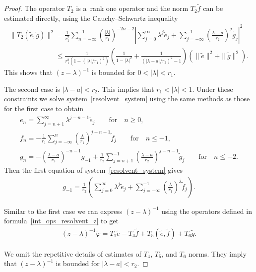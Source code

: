 \documentclass[11pt]{article}
\numberwithin{equation}{section}
\begin{document}
\begin{proof}
The operator $T_2$ is a~rank one operator and the norm $T_2\tilde{f}$ can be estimated directly, using the
Cauchy--Schwartz inequality
\begin{gather*}
\|T_2(\tilde{e},\tilde{g})\|^2=
\frac{1}{r_1^2}\sum\limits_{n=-\infty}^{-1}\left(\frac{|\lambda|}{r_1}\right)^{-2n-2}\left|\sum\limits_{j=0}^\infty\lambda^j\tilde{e}_j
+ \sum\limits_{j=-\infty}^{-1}\left(\frac{\lambda-a}{r_2}\right)^j\tilde{g}_j\right|^2
\\
\phantom{\|T_2(\tilde{e},\tilde{g})\|^2}{}
 \le\frac{1}{r_1^2(1-(|\lambda|/r_1)^2)}\left(\frac{1}{1-|\lambda|^2}+ \frac{1}{(|\lambda-a|/r_2)^2-1}\right)
\left(\|\tilde{e}\|^2+\|\tilde{g}\|^2\right).
\end{gather*}
This shows that $(z-\lambda)^{-1}$ is bounded for $0<|\lambda|<r_1$.

The second case is $|\lambda-a|<r_2$.
This implies that $r_1<|\lambda|<1$.
Under these constraints we solve system~\eqref{resolvent_system} using the same methods as those for the f\/irst case to
obtain
\begin{gather*}
e_n =\sum\limits_{j=n+1}^\infty \lambda^{j-n-1}\tilde{e}_j
\qquad\text{for}\quad n\ge0,
\\
f_n =-\frac{1}{r_1}\sum\limits_{j=-\infty}^n \left(\frac{\lambda}{r_1}\right)^{j-n-1}\tilde{f}_j
\qquad\text{for}\quad n\le-1,
\\
g_n =-\left(\frac{\lambda-a}{r_2}\right)^{-n-1}g_{-1}+\frac{1}{r_2}\sum\limits_{j=n+1}^{-1}\left(\frac{\lambda-a}{r_2}\right)^{j-n-1}\tilde{g}_j
\qquad
\text{for}
\quad
n\le-2.
\end{gather*}
Then the f\/irst equation of system~\eqref{resolvent_system} gives
\begin{gather*}
g_{-1}=\frac{1}{r_2}\left(\sum\limits_{j=0}^\infty\lambda^j\tilde{e}_j+\sum\limits_{j=-\infty}^{-1}\left(\frac{\lambda}{r_1}\right)^j\tilde{f}_j\right).
\end{gather*}

Similar to the f\/irst case we can express $(z-\lambda)^{-1}$ using the operators def\/ined in
formula~\eqref{int_ops_resolvent_z} to get
\begin{gather*}
(z-\lambda)^{-1}\tilde{\varphi}=T_1\tilde{e}-T_4\tilde{f}+T_5(\tilde{e},\tilde{f})+T_6\tilde{g}.
\end{gather*}

We omit the repetitive details of estimates of $T_4$, $T_5$, and $T_6$ norms.
They imply that $(z-\lambda)^{-1}$ is bounded for $|\lambda -a|<r_2$.


\end{proof}
\end{document}

